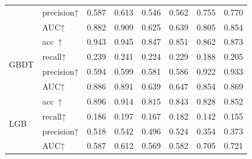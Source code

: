 \begin{table}[h]
{{\begin{tabular}{llllllll}
				& precision↑               & 0.587 & 0.613                          & 0.546 & 0.562                                                                                    & 0.755 & 0.770                         \\
				& AUC↑                     & 0.882 & 0.909                          & 0.625 & 0.639                                                                                    & 0.805 & 0.854                         \\
				\multirow{4}{*}{GBDT}           & acc~↑                    & 0.943 & 0.945                          & 0.847 & 0.851                                                                                    & 0.862 & 0.873                         \\
				& recall↑                  & 0.239 & 0.241                          & 0.224 & 0.229                                                                                    & 0.188 & 0.205                         \\
				& precision↑               & 0.594 & 0.599                          & 0.581 & 0.586                                                                                    & 0.922 & 0.933                         \\
				& AUC↑                     & 0.886 & 0.891                          & 0.639 & 0.647                                                                                    & 0.854 & 0.869                         \\
				\multirow{4}{*}{LGB}            & acc~↑                    & 0.896 & 0.914                          & 0.815 & 0.843                                                                                    & 0.828 & 0.852                         \\
				& recall↑                  & 0.186 & 0.197                          & 0.167 & 0.182                                                                                    & 0.142 & 0.155                         \\
				& precision↑               & 0.518 & 0.542                          & 0.496 & 0.524                                                                                    & 0.354 & 0.373                         \\
				& AUC↑                     & 0.587 & 0.612                          & 0.569 & 0.582                                                                                    & 0.705 & 0.721                         \\
				\toprule[1.5pt]
			\end{tabular}
		}
	}
\end{table}
\vspace{-0.1cm}

